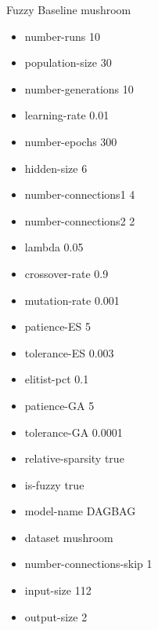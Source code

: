 Fuzzy Baseline
mushroom
\begin{itemize}
\item number-runs 10
\item population-size 30
\item number-generations 10
\item learning-rate 0.01
\item number-epochs 300
\item hidden-size 6
\item number-connections1 4
\item number-connections2 2
\item lambda 0.05
\item crossover-rate 0.9
\item mutation-rate 0.001
\item patience-ES 5
\item tolerance-ES 0.003
\item elitist-pct 0.1
\item patience-GA 5
\item tolerance-GA 0.0001
\item relative-sparsity true
\item is-fuzzy true
\item model-name DAGBAG
\item dataset mushroom
\item number-connections-skip 1
\item input-size 112
\item output-size 2
\end{itemize}


